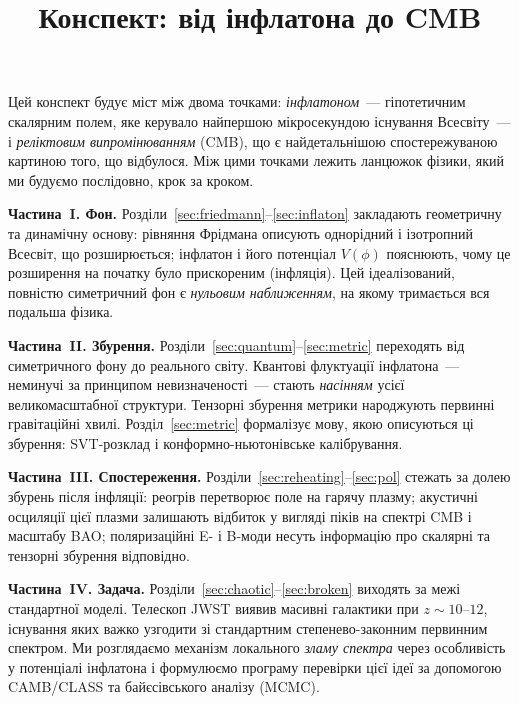 \documentclass[12pt, a4paper]{article}
\title{\bfseries Конспект: від інфлатона до CMB}
\author{}
\date{}
\begin{document}
\maketitle
\tableofcontents
\newpage


Цей конспект будує міст між двома точками: \emph{інфлатоном}~---
гіпотетичним скалярним полем, яке керувало найпершою мікросекундою
існування Всесвіту~--- і \emph{реліктовим випромінюванням} (CMB),
що є найдетальнішою спостережуваною картиною того, що відбулося.
Між цими точками лежить ланцюжок фізики, який ми будуємо
послідовно, крок за кроком.

\textbf{Частина~I. Фон.} Розділи~\ref{sec:friedmann}–\ref{sec:inflaton}
закладають геометричну та динамічну основу: рівняння Фрідмана описують
однорідний і ізотропний Всесвіт, що розширюється; інфлатон і його
потенціал $V(\phi)$ пояснюють, чому це розширення на початку було
прискореним (інфляція). Цей ідеалізований, повністю симетричний фон є
\emph{нульовим наближенням}, на якому тримається вся подальша фізика.

\textbf{Частина~II. Збурення.} Розділи~\ref{sec:quantum}–\ref{sec:metric}
переходять від симетричного фону до реального світу. Квантові флуктуації
інфлатона~--- неминучі за принципом невизначеності~--- стають
\emph{насінням} усієї великомасштабної структури. Тензорні збурення
метрики народжують первинні гравітаційні хвилі. Розділ~\ref{sec:metric}
формалізує мову, якою описуються ці збурення: SVT-розклад і
конформно-ньютонівське калібрування.

\textbf{Частина~III. Спостереження.} Розділи~\ref{sec:reheating}–\ref{sec:pol}
стежать за долею збурень після інфляції: реогрів перетворює поле на
гарячу плазму; акустичні осциляції цієї плазми залишають відбиток у
вигляді піків на спектрі CMB і масштабу BAO; поляризаційні E- і B-моди
несуть інформацію про скалярні та тензорні збурення відповідно.

\textbf{Частина~IV. Задача.} Розділи~\ref{sec:chaotic}–\ref{sec:broken}
виходять за межі стандартної моделі. Телескоп JWST виявив масивні
галактики при $z \sim 10$–$12$, існування яких важко узгодити зі
стандартним степенево-законним первинним спектром. Ми розглядаємо
механізм локального \emph{зламу спектра} через особливість у потенціалі
інфлатона і формулюємо програму перевірки цієї ідеї за допомогою
CAMB/CLASS та байєсівського аналізу (MCMC).
\end{document}
